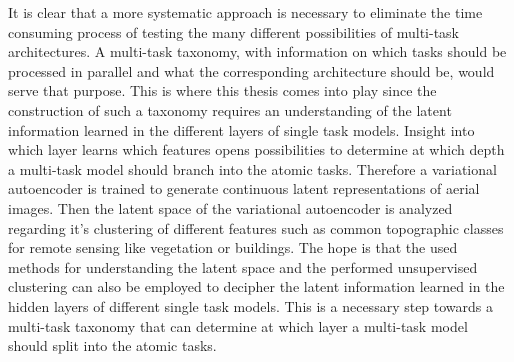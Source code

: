 It is clear that a more systematic approach is necessary to eliminate the time consuming process of testing 
the many different possibilities of multi-task architectures. A multi-task taxonomy, with information on which tasks
should be processed in parallel and what the corresponding architecture should be, would serve that purpose.
This is where this thesis comes into play since the construction of such a taxonomy requires an understanding
of the latent information learned in the different layers of single task models. Insight into which layer
learns which features opens possibilities to determine at which depth a multi-task model should branch
into the atomic tasks. 
Therefore a variational autoencoder is trained to generate continuous latent representations of aerial images.
Then the latent space of the variational autoencoder is analyzed regarding it's clustering of different
features such as common topographic classes for remote sensing like vegetation or buildings. The hope is that 
the used methods for understanding the latent space and the performed unsupervised clustering can also be
employed to decipher the latent information learned in the hidden layers of different single task models. 
This is a necessary step towards a multi-task taxonomy that can determine at which layer a multi-task model
should split into the atomic tasks.